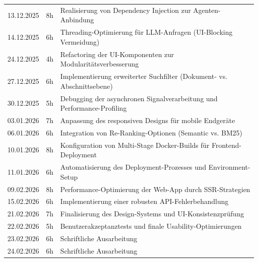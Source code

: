 \begin{table}[H]
\begin{tabular}{|l|c|p{8.5cm}|}
		13.12.2025                                 & 8h            & Realisierung von Dependency Injection zur Agenten-Anbindung                 \\
		14.12.2025                                 & 6h            & Threading-Optimierung für LLM-Anfragen (UI-Blocking Vermeidung)              \\
		24.12.2025                                 & 4h            & Refactoring der UI-Komponenten zur Modularitätsverbesserung                  \\
		27.12.2025                                 & 6h            & Implementierung erweiterter Suchfilter (Dokument- vs. Abschnittsebene)        \\
		30.12.2025                                 & 5h            & Debugging der asynchronen Signalverarbeitung und Performance-Profiling       \\
		03.01.2026                                 & 7h            & Anpassung des responsiven Designs für mobile Endgeräte                       \\
		06.01.2026                                 & 6h            & Integration von Re-Ranking-Optionen (Semantic vs. BM25)                      \\
		10.01.2026                                 & 8h            & Konfiguration von Multi-Stage Docker-Builds für Frontend-Deployment          \\
		11.01.2026                                 & 6h            & Automatisierung des Deployment-Prozesses und Environment-Setup               \\
		09.02.2026                                 & 8h            & Performance-Optimierung der Web-App durch SSR-Strategien                      \\
		15.02.2026                                 & 6h            & Implementierung einer robusten API-Fehlerbehandlung                          \\
		21.02.2026                                 & 7h            & Finalisierung des Design-Systems und UI-Konsistenzprüfung                   \\
		22.02.2026                                 & 5h            & Benutzerakzeptanztests und finale Usability-Optimierungen                      \\
		23.02.2026                                 & 6h            & Schriftliche Ausarbeitung                                                    \\
		24.02.2026                                 & 6h            & Schriftliche Ausarbeitung                                                    \\

\end{tabular}
\end{table}
